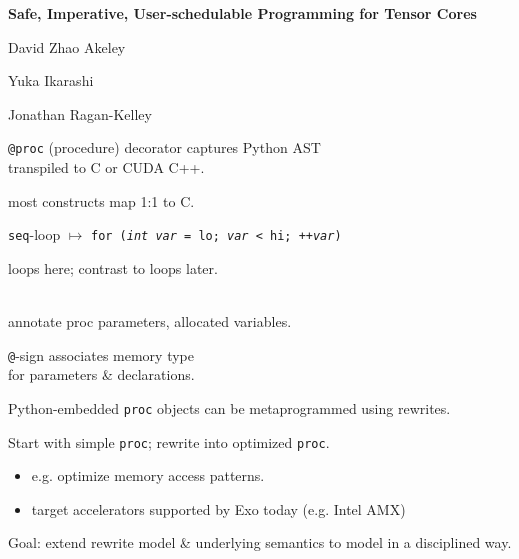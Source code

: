 
\textbf{\hfill \large Safe, Imperative, User-schedulable Programming for Tensor Cores}

{\LARGE

\vfill

David Zhao Akeley

Yuka Ikarashi

Jonathan Ragan-Kelley

\hfill {}}


\newpage
{}

{\large

}

{\LARGE
\texttt{@proc} (procedure) decorator captures Python AST\\transpiled to C or CUDA C++.

 most constructs map 1:1 to C.

}

\newpage
{}

{\large

}

{\LARGE
\texttt{seq}-loop $\mapsto$ \texttt{for (\textit{int var} = lo; \textit{var} < hi; ++\textit{var})}

 loops here; contrast to  loops later.

}

\newpage
{}

{\large

}

{\LARGE
{}\\
annotate proc parameters, allocated variables.

}

\newpage
{}

{\large

}

{\LARGE
{} \texttt{@}-sign associates memory type\\
for parameters \& declarations.
}

\newpage
{}

{\LARGE
{} Python-embedded \texttt{proc} objects can be metaprogrammed using  rewrites.

Start with simple \texttt{proc}; rewrite into optimized \texttt{proc}.
\begin{itemize}
  \item e.g. optimize memory access patterns.
  \item target  accelerators supported by Exo today (e.g. Intel AMX)
\end{itemize}


Goal: extend rewrite model \& underlying semantics to model  in a disciplined way.

}


